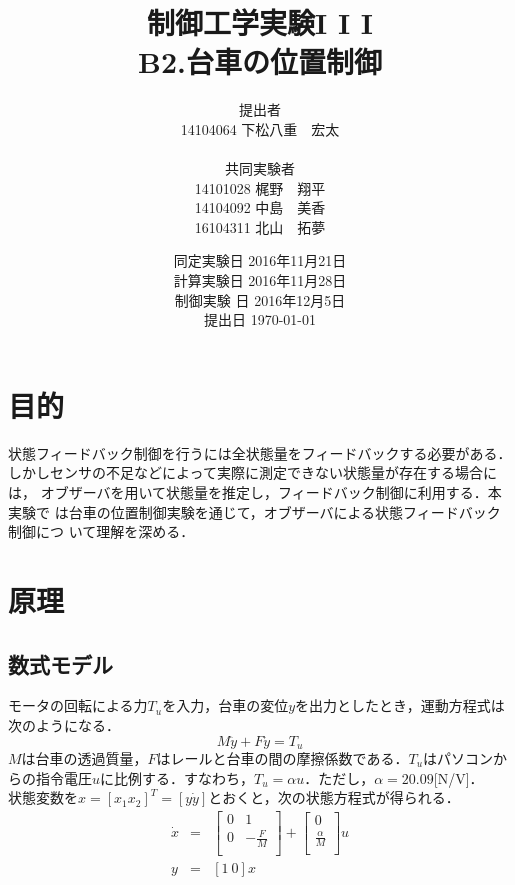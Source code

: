 \documentclass[11pt,a4paper]{jsarticle}
\begin{document}
\title{制御工学実験I \hspace{-0.1mm} I \hspace{-0.1mm} I \\ B2.台車の位置制御}
\author{提出者 \\ 14104064 下松八重　宏太 \\ \\ 共同実験者 \\ 14101028 梶野　翔平 \\ 14104092 中島　美香 \\ 16104311 北山　拓夢}
\date{同定実験日 2016年11月21日 \\ 計算実験日 2016年11月28日 \\ 制御実験
日 2016年12月5日 \\ 提出日 \today}



\maketitle
\thispagestyle{empty}
\newpage


\section{目的}
状態フィードバック制御を行うには全状態量をフィードバックする必要がある．
しかしセンサの不足などによって実際に測定できない状態量が存在する場合には，
オブザーバを用いて状態量を推定し，フィードバック制御に利用する．本実験で
は台車の位置制御実験を通じて，オブザーバによる状態フィードバック制御につ
いて理解を深める．
\section{原理}
  \subsection{数式モデル}
  モータの回転による力$T_u$を入力，台車の変位$y$を出力としたとき，運動方程式は次のようになる．
  \begin{equation}
   M\ddot{y}+F\ddot{y}=T_u
  \end{equation}
  $M$は台車の透過質量，$F$はレールと台車の間の摩擦係数である．$T_u$はパソコンからの指令電圧$u$に比例する．すなわち，$T_u = \alpha u$．ただし，$\alpha = 20.09$[N/V]． \\
  状態変数を$x = [x_1 x_2]^T = [y \dot{y}]$とおくと，次の状態方程式が得られる．
  \begin{eqnarray}
   \dot{x} &=& \left[
		\begin{array}{cc}
		 0 & 1 \\
		 0 & -\frac{F}{M}\\
		\end{array}
		  \right]
   + \left[
      \begin{array}{c}
       0 \\
       \frac{\alpha}{M}\\
      \end{array}
     \right]u \nonumber \\
   y &=& [1 \ 0]x
  \end{eqnarray}
\end{document}
